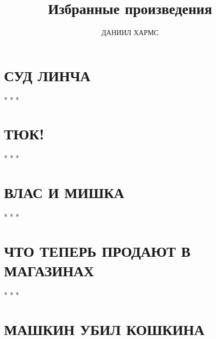 \documentclass[12pt]{article}
\begin{document}
\author{ДАНИИЛ ХАРМС}
\title{Избранные произведения}

\maketitle

\section*{СУД ЛИНЧА}
\vspace{1em}

\centerline{* * *}

\section*{ТЮК!}
\vspace{1em}

\centerline{* * *}

\section*{ВЛАС И МИШКА}
\vspace{1em}

\centerline{* * *}

\section*{ЧТО ТЕПЕРЬ ПРОДАЮТ В МАГАЗИНАХ}
\vspace{1em}

\centerline{* * *}

\section*{МАШКИН УБИЛ КОШКИНА}
\vspace{1em}

\end{document}
